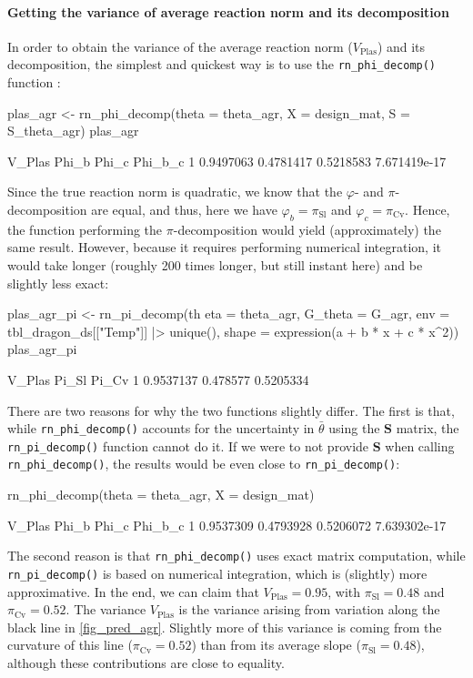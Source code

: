 \documentclass[a4paper,12pt,twoside]{article}
\begin{document}
\paragraph{Getting the variance of average reaction norm and its decomposition}
In order to obtain the variance of the average reaction norm ($V_{\text{Plas}}$) and its decomposition, the simplest and quickest way is to use the \texttt{rn\_phi\_decomp()} function :
\begin{Rinput}
plas_agr <-
    rn_phi_decomp(theta = theta_agr, X = design_mat, S = S_theta_agr)
plas_agr
\end{Rinput}
\begin{Routput}
     V_Plas     Phi_b     Phi_c      Phi_b_c
1 0.9497063 0.4781417 0.5218583 7.671419e-17
\end{Routput}
Since the true reaction norm is quadratic, we know that the $\varphi$- and $\pi$-decomposition are equal, and thus, here we have $\varphi_{b}=\pi_{\text{Sl}}$ and $\varphi_{c}=\pi_{\text{Cv}}$.
Hence, the function performing the $\pi$-decomposition would yield (approximately) the same result.
However, because it requires performing numerical integration, it would take longer (roughly 200 times longer, but still instant here) and be slightly less exact:
\begin{Rinput}
plas_agr_pi <-
    rn_pi_decomp(th eta   = theta_agr,
                 G_theta = G_agr,
                 env     = tbl_dragon_ds[["Temp"]] |> unique(),
                 shape   = expression(a + b * x + c * x^2))
plas_agr_pi
\end{Rinput}
\begin{Routput}
     V_Plas    Pi_Sl     Pi_Cv
1 0.9537137 0.478577 0.5205334
\end{Routput}
There are two reasons for why the two functions slightly differ. The first is that, while \texttt{rn\_phi\_decomp()} accounts for the uncertainty in $\bar{\theta}$ using the $\mathbf{S}$ matrix, the \texttt{rn\_pi\_decomp()} function cannot do it. If we were to not provide $\mathbf{S}$ when calling \texttt{rn\_phi\_decomp()}, the results would be even close to \texttt{rn\_pi\_decomp()}:
\begin{Rinput}
rn_phi_decomp(theta = theta_agr, X = design_mat)
\end{Rinput}
\begin{Routput}
     V_Plas     Phi_b     Phi_c      Phi_b_c
1 0.9537309 0.4793928 0.5206072 7.639302e-17
\end{Routput}
The second reason is that \texttt{rn\_phi\_decomp()} uses exact matrix computation, while \texttt{rn\_pi\_decomp()} is based on numerical integration, which is (slightly) more approximative.
In the end, we can claim that $V_{\text{Plas}}=0.95$, with $\pi_{\text{Sl}}=0.48$ and $\pi_{\text{Cv}}=0.52$.
The variance $V_{\text{Plas}}$ is the variance arising from variation along the black line in \autoref{fig_pred_agr}. 
Slightly more of this variance is coming from the curvature of this line ($\pi_{\text{Cv}}=0.52$) than from its average slope ($\pi_{\text{Sl}}=0.48$), although these contributions are close to equality.
\end{document}
